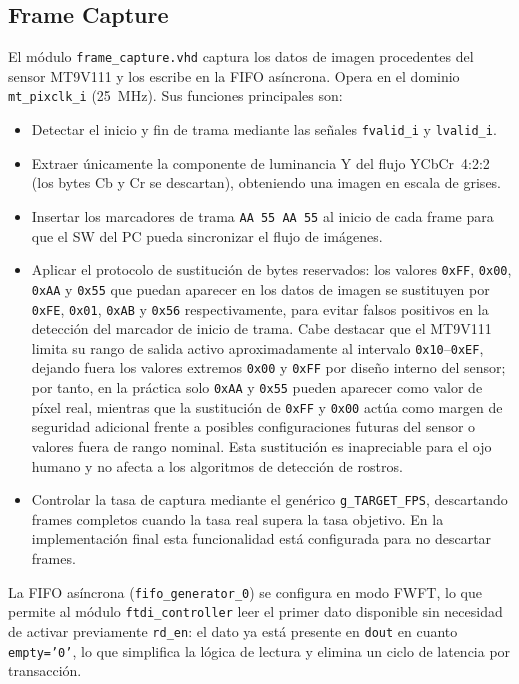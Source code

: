 \documentclass[../main.tex]{subfiles}
\begin{document}
\subsection{Frame Capture}
\label{sec:frame_capture}

El módulo \texttt{frame\_capture.vhd} captura los datos de imagen procedentes del sensor MT9V111 y los escribe en la FIFO asíncrona. Opera en el dominio \texttt{mt\_pixclk\_i} (25~MHz). Sus funciones principales son:

\begin{itemize}
    \item Detectar el inicio y fin de trama mediante las señales \texttt{fvalid\_i} y \texttt{lvalid\_i}.
    \item Extraer únicamente la componente de luminancia Y del flujo YCbCr~4:2:2 (los bytes Cb y Cr se descartan), obteniendo una imagen en escala de grises.
    \item Insertar los marcadores de trama \texttt{AA 55 AA 55} al inicio de cada frame para que el \ac{SW} del PC pueda sincronizar el flujo de imágenes.
    \item Aplicar el protocolo de sustitución de bytes reservados: los valores \texttt{0xFF}, \texttt{0x00}, \texttt{0xAA} y \texttt{0x55} que puedan aparecer en los datos de imagen se sustituyen por \texttt{0xFE}, \texttt{0x01}, \texttt{0xAB} y \texttt{0x56} respectivamente, para evitar falsos positivos en la detección del marcador de inicio de trama. Cabe destacar que el MT9V111 limita su rango de salida activo aproximadamente al intervalo \texttt{0x10}--\texttt{0xEF}, dejando fuera los valores extremos \texttt{0x00} y \texttt{0xFF} por diseño interno del sensor; por tanto, en la práctica solo \texttt{0xAA} y \texttt{0x55} pueden aparecer como valor de píxel real, mientras que la sustitución de \texttt{0xFF} y \texttt{0x00} actúa como margen de seguridad adicional frente a posibles configuraciones futuras del sensor o valores fuera de rango nominal. Esta sustitución es inapreciable para el ojo humano y no afecta a los algoritmos de detección de rostros.
    \item Controlar la tasa de captura mediante el genérico \texttt{g\_TARGET\_FPS}, descartando frames completos cuando la tasa real supera la tasa objetivo. En la implementación final esta funcionalidad está configurada para no descartar frames.
\end{itemize}

La FIFO asíncrona (\texttt{fifo\_generator\_0}) se configura en modo \ac{FWFT}, lo que permite al módulo \texttt{ftdi\_controller} leer el primer dato disponible sin necesidad de activar previamente \texttt{rd\_en}: el dato ya está presente en \texttt{dout} en cuanto \texttt{empty='0'}, lo que simplifica la lógica de lectura y elimina un ciclo de latencia por transacción.
\end{document}
